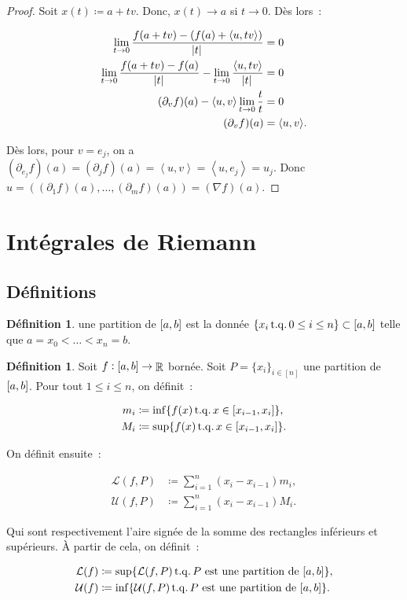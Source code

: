 \documentclass{article}
\DeclareMathOperator{\R}{\mathbb R}
\DeclareMathOperator{\tq}{ t.q. }
\newcommand{\scpr}[2]{{\left\langle#1, #2\right\rangle}}
\newcommand{\ab}{\interval ab}
\newcommand{\fabr}[1]{#1 : \ab \to \R}
\theoremstyle{definition}
\newtheorem{déf}[thm]{Définition}
\theoremstyle{remark}
\begin{document}
		\begin{proof} Soit $x(t) \coloneqq a + tv$. Donc, $x(t) \to a$ si $t \to 0$. Dès lors~:

		\begin{align*}
			\lim_{t \to 0} \frac {f(a+tv)-(f(a) + \scpr u{tv})}{\abs t} &= 0 \\
			\lim_{t \to 0} \frac {f(a+tv)-f(a)}{\abs t} - \lim_{t \to 0}\frac {\scpr u{tv}}{\abs t} &= 0 \\
			(\partial_v f)(a) - \scpr uv \lim_{t \to 0}\frac tt &= 0 \\
			(\partial_v f)(a) &= \scpr uv.
		\end{align*}

		Dès lors, pour $v = e_j$, on a $(\partial_{e_j} f)(a) = (\partial_j f)(a) = \scpr uv = \scpr u{e_j} = u_j$. Donc
		$u = ((\partial_1 f)(a), \ldots, (\partial_m f)(a)) = (\nabla f)(a)$. \end{proof}

\newpage
\section{Intégrales de Riemann}
		\subsection{Définitions}

		\begin{déf} une partition de $\ab$ est la donnée $\{x_i \tq 0 \leq i \leq n\} \subset \ab$ telle que $a = x_0 < \ldots < x_n = b$. \end{déf}

		\begin{déf} Soit $\fabr f$ bornée. Soit $P = \{x_i\}_{i \in [n]}$  une partition de $\ab$. Pour tout $1 \leq i \leq n$, on définit~:

		\begin{align*}
			m_i &\coloneqq \inf \{f(x) \tq x \in \interval {x_{i-1}}{x_i}\}, \\
			M_i &\coloneqq \sup \{f(x) \tq x \in \interval {x_{i-1}}{x_i}\}.
		\end{align*}

		On définit ensuite~:

		\begin{align*}
			\mathcal L(f, P) &\coloneqq \sum_{i=1}^n(x_i-x_{i-1})m_i, \\
			\mathcal U(f, P) &\coloneqq \sum_{i=1}^n(x_i-x_{i-1})M_i.
		\end{align*}

		Qui sont respectivement l'aire signée de la somme des rectangles inférieurs et supérieurs. À partir de cela, on définit~:

		\begin{align*}
			\mathcal L(f) &\coloneqq \sup \{\mathcal L(f, P) \tq P \text{ est une partition de } \ab\}, \\
			\mathcal U(f) &\coloneqq \inf \{\mathcal U(f, P) \tq P \text{ est une partition de } \ab\}.
		\end{align*}
		\end{déf}
\end{document}
